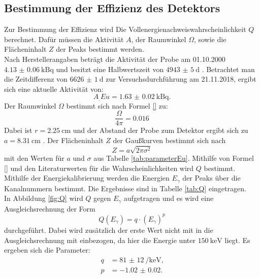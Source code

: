 \subsection{Bestimmung der Effizienz des Detektors}

Zur Bestimmung der Effizienz wird Die Vollenergienachweiswahrscheinlichkeit $Q$ berechnet. Dafür müssen die Aktivität $A$, der Raumwinkel $\Omega$, sowie die Flächeninhalt $Z$ der Peaks bestimmt werden.\\
Nach Herstellerangaben beträgt die Aktivität der Probe am 01.10.2000 $\SI{4.13(6)}{\kilo\becquerel}$ und besitzt eine Halbwertszeit von $\SI{4943(5)}{\day}$ \cite{V18}. Betrachtet man die Zeitdifferenz von $\SI{6626(1)}{\day}$ zur Versuchsdurchführung am 21.11.2018, ergibt sich eine aktuelle Aktivität von:
\[
A_.{Eu}=\SI{1.63(2)}{\kilo\becquerel}\text{.}
\]
Der Raumwinkel $\Omega$ bestimmt sich nach Formel \eqref{} zu:
\[
\frac{\Omega}{4\pi} = 0.016
\]
Dabei ist $r=\SI{2.25}{\centi\metre}$ und der Abstand der Probe zum Detektor ergibt sich zu $a=\SI{8.31}{\centi\metre}$ \cite{V18}.
Der Flächeninhalt $Z$ der Gaußkurven bestimmt sich nach
\begin{equation}
Z = a\sqrt{2\pi\sigma^2} \label{eq:I_Gaus}
\end{equation}
mit den Werten für $a$ und $\sigma$ aus Tabelle \ref{tab:parameterEu}.
Mithilfe von Formel \eqref{} und den Literaturwerten für die Wahrscheinlichkeiten \cite{MARTIN20131497} wird $Q$ bestimmt.
Mithilfe der Energiekalibrierung werden die Energien $E_\gamma$ der Peaks über die Kanalnummern bestimmt. Die Ergebnisse sind in Tabelle \ref{tab:Q} eingetragen.\\
In Abbildung \ref{fig:Q} wird $Q$ gegen $E_\gamma$ aufgetragen und es wird eine Ausgleichsrechnung der Form
\[
Q(E_\gamma)=q\cdot (E_\gamma)^p
\] 
durchgeführt. Dabei wird zusätzlich der erste Wert nicht mit in die Ausgleichsrechnung mit einbezogen, da hier die Energie unter $\SI{150}{\kilo\electronvolt}$ liegt.  
Es ergeben sich die Parameter:
\begin{align*}
q	&=	\SI{81(12)}{\per\kilo\electronvolt}\text{,}\\
p	&=	\num{-1.02(2)}\text{.}
\end{align*}

